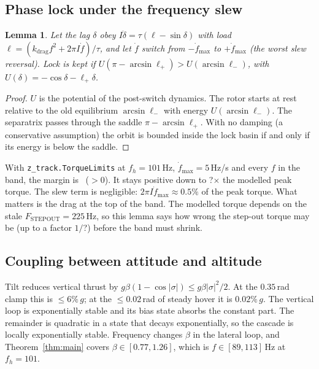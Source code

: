\documentclass[11pt]{article}
\newtheorem{lemma}{Lemma}
\newcommand{\lockTorqueScale}{?}\newcommand{\certLeakC}{?}\newcommand{\certLeakD}{?}%
\begin{document}
\subsection{Phase lock under the frequency slew}
\label{sec:lock}
\begin{lemma}
Let the lag $\delta$ obey $I\ddot\delta=\tau(\ell-\sin\delta)$ with load
$\ell=(k_{\mathrm{drag}}f^2+2\pi I\dot f)/\tau$, and let $\dot f$ switch from $-\dot f_{\max}$ to
$+\dot f_{\max}$ (the worst slew reversal). Lock is kept if
$U(\pi-\arcsin\ell_+)>U(\arcsin\ell_-)$, with $U(\delta)=-\cos\delta-\ell_+\delta$.
\end{lemma}
\begin{proof}
$U$ is the potential of the post-switch dynamics. The rotor starts at rest relative to the old
equilibrium $\arcsin\ell_-$ with energy $U(\arcsin\ell_-)$. The separatrix passes through the saddle
$\pi-\arcsin\ell_+$. With no damping (a conservative assumption) the orbit is bounded inside the
lock basin if and only if its energy is below the saddle.
\end{proof}
With \texttt{z\_track.TorqueLimits} at $f_h=101$\,Hz, $\dot f_{\max}=5$\,Hz/s and every $f$ in the
band, the margin is \lockMargin\ ($>0$). It stays positive down to \lockTorqueScale$\times$ the
modelled peak torque. The slew term is negligible: $2\pi I\dot f_{\max}\approx 0.5\%$ of the peak
torque. What matters is the drag at the top of the band. The modelled torque depends on the stale
$F_{\mathrm{STEPOUT}}=225$\,Hz, so this lemma says how wrong the step-out torque may be (up to a
factor $1/$\lockTorqueScale) before the band must shrink.

\subsection{Coupling between attitude and altitude}
\label{sec:coupling}
Tilt reduces vertical thrust by $g\beta(1-\cos|\sigma|)\le g\beta|\sigma|^2/2$. At the $0.35$\,rad
clamp this is $\le6\%\,g$; at the $\le0.02$\,rad of steady hover it is $0.02\%\,g$. The vertical loop is
exponentially stable and its bias state absorbs the constant part. The remainder is quadratic in a
state that decays exponentially, so the cascade is locally exponentially stable. Frequency changes
$\beta$ in the lateral loop, and Theorem~\ref{thm:main} covers $\beta\in[0.77,1.26]$, which is
$f\in[89,113]$\,Hz at $f_h=101$.
\end{document}
